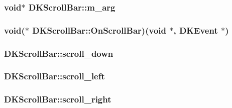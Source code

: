 \hypertarget{class_d_k_scroll_bar_a19e951b1f6fac9961a5b3d04441a2a90}{
\subsubsection[{m\-\_\-arg}]{\setlength{\rightskip}{0pt plus 5cm}void$\ast$ D\-K\-Scroll\-Bar\-::m\-\_\-arg}}\label{class_d_k_scroll_bar_a19e951b1f6fac9961a5b3d04441a2a90}
\hypertarget{class_d_k_scroll_bar_a3745939ebbb0453fbfd01d005ce949a4}{
\subsubsection[{On\-Scroll\-Bar}]{\setlength{\rightskip}{0pt plus 5cm}void($\ast$ D\-K\-Scroll\-Bar\-::\-On\-Scroll\-Bar)(void $\ast$, {\bf D\-K\-Event} $\ast$)}}\label{class_d_k_scroll_bar_a3745939ebbb0453fbfd01d005ce949a4}
\hypertarget{class_d_k_scroll_bar_adf1f3b3352b223b0bc149835c7feb6cf}{
\subsubsection[{scroll\-\_\-down}]{ D\-K\-Scroll\-Bar\-::scroll\-\_\-down}}\label{class_d_k_scroll_bar_adf1f3b3352b223b0bc149835c7feb6cf}
\hypertarget{class_d_k_scroll_bar_a3942184400e1a2f34eae1a6a24e56823}{
\subsubsection[{scroll\-\_\-left}]{ D\-K\-Scroll\-Bar\-::scroll\-\_\-left}}\label{class_d_k_scroll_bar_a3942184400e1a2f34eae1a6a24e56823}
\hypertarget{class_d_k_scroll_bar_a6ec476e55a0a3d7026067986403e85bf}{
\subsubsection[{scroll\-\_\-right}]{ D\-K\-Scroll\-Bar\-::scroll\-\_\-right}}\label{class_d_k_scroll_bar_a6ec476e55a0a3d7026067986403e85bf}
